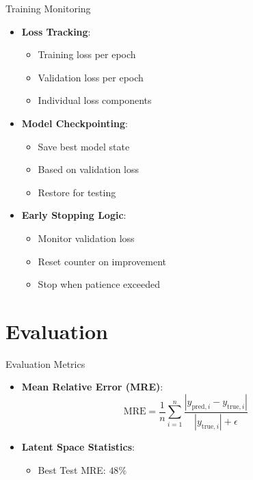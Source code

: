 \documentclass{beamer}
\begin{document}
\begin{frame}{Training Monitoring}
    \begin{itemize}
        \item \textbf{Loss Tracking}:
        \begin{itemize}
            \item Training loss per epoch
            \item Validation loss per epoch
            \item Individual loss components
        \end{itemize}
        \item \textbf{Model Checkpointing}:
        \begin{itemize}
            \item Save best model state
            \item Based on validation loss
            \item Restore for testing
        \end{itemize}
        \item \textbf{Early Stopping Logic}:
        \begin{itemize}
            \item Monitor validation loss
            \item Reset counter on improvement
            \item Stop when patience exceeded
        \end{itemize}
    \end{itemize}
\end{frame}

\section{Evaluation}

\begin{frame}{Evaluation Metrics}
    \begin{itemize}
        \item \textbf{Mean Relative Error (MRE)}:
        \[ \text{MRE} = \frac{1}{n}\sum_{i=1}^{n}\frac{|y_{\text{pred},i} - y_{\text{true},i}|}{|y_{\text{true},i}| + \epsilon} \]
        \item \textbf{Latent Space Statistics}:
        \begin{itemize}
            \item Best Test MRE: $48\%$
        \end{itemize}
    \end{itemize}
\end{frame}
\end{document}
